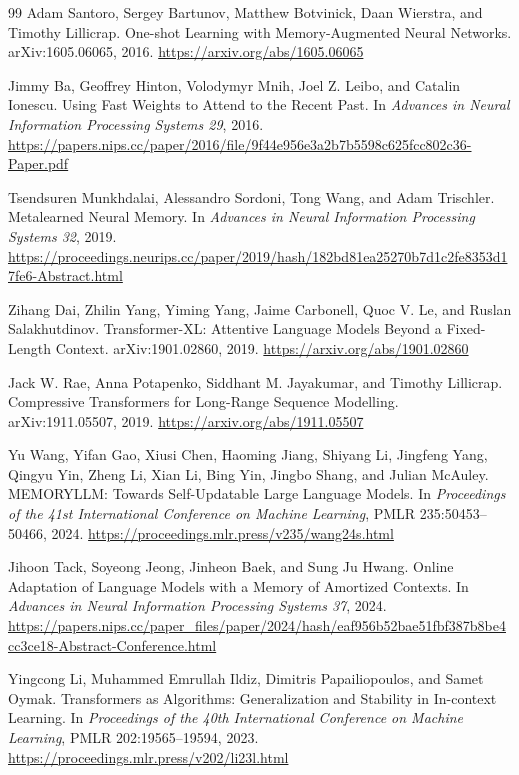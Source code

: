 \documentclass[11pt,a4paper]{article}
\begin{document}
\begin{thebibliography}{99}
Adam Santoro, Sergey Bartunov, Matthew Botvinick, Daan Wierstra, and Timothy Lillicrap.
\newblock One-shot Learning with Memory-Augmented Neural Networks.
\newblock arXiv:1605.06065, 2016.
\newblock \url{https://arxiv.org/abs/1605.06065}

Jimmy Ba, Geoffrey Hinton, Volodymyr Mnih, Joel Z. Leibo, and Catalin Ionescu.
\newblock Using Fast Weights to Attend to the Recent Past.
\newblock In \emph{Advances in Neural Information Processing Systems 29}, 2016.
\newblock \url{https://papers.nips.cc/paper/2016/file/9f44e956e3a2b7b5598c625fcc802c36-Paper.pdf}

Tsendsuren Munkhdalai, Alessandro Sordoni, Tong Wang, and Adam Trischler.
\newblock Metalearned Neural Memory.
\newblock In \emph{Advances in Neural Information Processing Systems 32}, 2019.
\newblock \url{https://proceedings.neurips.cc/paper/2019/hash/182bd81ea25270b7d1c2fe8353d17fe6-Abstract.html}

Zihang Dai, Zhilin Yang, Yiming Yang, Jaime Carbonell, Quoc V. Le, and Ruslan Salakhutdinov.
\newblock Transformer-XL: Attentive Language Models Beyond a Fixed-Length Context.
\newblock arXiv:1901.02860, 2019.
\newblock \url{https://arxiv.org/abs/1901.02860}

Jack W. Rae, Anna Potapenko, Siddhant M. Jayakumar, and Timothy Lillicrap.
\newblock Compressive Transformers for Long-Range Sequence Modelling.
\newblock arXiv:1911.05507, 2019.
\newblock \url{https://arxiv.org/abs/1911.05507}

Yu Wang, Yifan Gao, Xiusi Chen, Haoming Jiang, Shiyang Li, Jingfeng Yang, Qingyu Yin, Zheng Li, Xian Li, Bing Yin, Jingbo Shang, and Julian McAuley.
\newblock MEMORYLLM: Towards Self-Updatable Large Language Models.
\newblock In \emph{Proceedings of the 41st International Conference on Machine Learning}, PMLR 235:50453--50466, 2024.
\newblock \url{https://proceedings.mlr.press/v235/wang24s.html}

Jihoon Tack, Soyeong Jeong, Jinheon Baek, and Sung Ju Hwang.
\newblock Online Adaptation of Language Models with a Memory of Amortized Contexts.
\newblock In \emph{Advances in Neural Information Processing Systems 37}, 2024.
\newblock \url{https://papers.nips.cc/paper_files/paper/2024/hash/eaf956b52bae51fbf387b8be4cc3ce18-Abstract-Conference.html}

Yingcong Li, Muhammed Emrullah Ildiz, Dimitris Papailiopoulos, and Samet Oymak.
\newblock Transformers as Algorithms: Generalization and Stability in In-context Learning.
\newblock In \emph{Proceedings of the 40th International Conference on Machine Learning}, PMLR 202:19565--19594, 2023.
\newblock \url{https://proceedings.mlr.press/v202/li23l.html}


\end{thebibliography}
\end{document}
